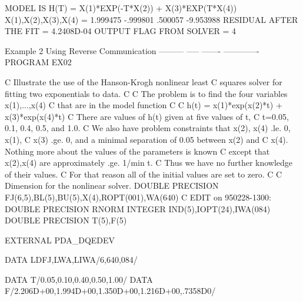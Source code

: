 \documentclass[11pt,twoside,nolof]{starlink}
\begin{document}
\begin{terminalv}
   MODEL IS H(T) = X(1)*EXP(-T*X(2)) + X(3)*EXP(T*X(4))
  X(1),X(2),X(3),X(4) =
      1.999475    -.999801     .500057   -9.953988
   RESIDUAL AFTER THE FIT =   4.2408D-04
   OUTPUT FLAG FROM SOLVER =                      4


  Example 2  Using Reverse Communication
  ---------  ----- ------- -------------
      PROGRAM EX02

C     Illustrate the use of the Hanson-Krogh nonlinear least
C     squares solver for fitting two exponentials to data.
C
C     The problem is to find the four variables x(1),...,x(4)
C     that are in the model function
C
C          h(t) = x(1)*exp(x(2)*t) + x(3)*exp(x(4)*t)
C     There are values of h(t) given at five values of t,
C     t=0.05, 0.1, 0.4, 0.5, and 1.0.
C     We also have problem constraints that x(2), x(4) .le. 0, x(1),
C     x(3) .ge. 0, and a minimal separation of 0.05 between x(2) and
C     x(4).  Nothing more about the values of the parameters is known
C     except that x(2),x(4) are approximately .ge. 1/min t.
C     Thus we have no further knowledge of their values.
C     For that reason all of the initial values are set to zero.
C
C     Dimension for the nonlinear solver.
      DOUBLE PRECISION FJ(6,5),BL(5),BU(5),X(4),ROPT(001),WA(640)
C  EDIT on 950228-1300:
      DOUBLE PRECISION RNORM
      INTEGER IND(5),IOPT(24),IWA(084)
      DOUBLE PRECISION T(5),F(5)

      EXTERNAL PDA_DQEDEV

      DATA LDFJ,LWA,LIWA/6,640,084/

      DATA T/0.05,0.10,0.40,0.50,1.00/
      DATA F/2.206D+00,1.994D+00,1.350D+00,1.216D+00,.7358D0/


\end{terminalv}
\end{document}
